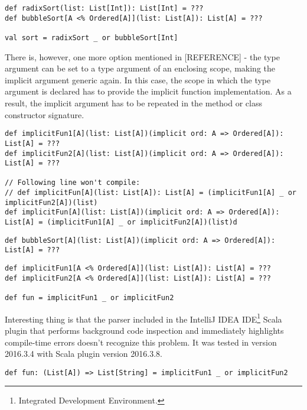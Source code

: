 \lstset{style=Scala}
\begin{lstlisting}
def radixSort(list: List[Int]): List[Int] = ???
def bubbleSort[A <% Ordered[A]](list: List[A]): List[A] = ???

val sort = radixSort _ or bubbleSort[Int]
\end{lstlisting}

There is, however, one more option mentioned in [REFERENCE] - the type argument can be set to a type argument of an enclosing scope, making the implicit argument generic again. In this case, the scope in which the type argument is declared has to provide the implicit function implementation. As a result, the implicit argument has to be repeated in the method or class constructor signature.

\lstset{style=Scala}
\begin{lstlisting}
def implicitFun1[A](list: List[A])(implicit ord: A => Ordered[A]): List[A] = ???
def implicitFun2[A](list: List[A])(implicit ord: A => Ordered[A]): List[A] = ???

// Following line won't compile:
// def implicitFun[A](list: List[A]): List[A] = (implicitFun1[A] _ or implicitFun2[A])(list)
def implicitFun[A](list: List[A])(implicit ord: A => Ordered[A]): List[A] = (implicitFun1[A] _ or implicitFun2[A])(list)d
\end{lstlisting}

\lstset{style=Scala}
\begin{lstlisting}
def bubbleSort[A](list: List[A])(implicit ord: A => Ordered[A]): List[A] = ???
\end{lstlisting}

\lstset{style=Scala}
\begin{lstlisting}
def implicitFun1[A <% Ordered[A]](list: List[A]): List[A] = ???
def implicitFun2[A <% Ordered[A]](list: List[A]): List[A] = ???

def fun = implicitFun1 _ or implicitFun2
\end{lstlisting}

Interesting thing is that the parser included in the IntelliJ IDEA IDE\footnote{Integrated Development Environment.} Scala plugin that performs background code inspection and immediately highlights compile-time errors doesn't recognize this problem. It was tested in version 2016.3.4 with Scala plugin version 2016.3.8.


\lstset{style=Scala}
\begin{lstlisting}
def fun: (List[A]) => List[String] = implicitFun1 _ or implicitFun2
\end{lstlisting}

